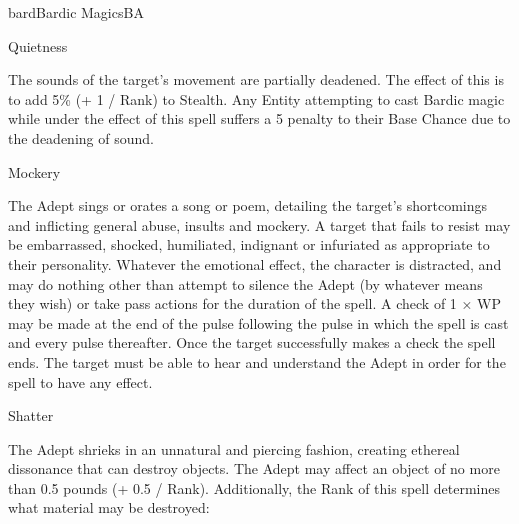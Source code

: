 \begin{College}[2.1]{bard}{Bardic Magics}{BA}
\begin{spell}[G-5]{Quietness}

\begin{effects}
The sounds of the target’s movement are partially deadened. The effect
of this is to add 5\% (+ 1 / Rank) to Stealth.  Any Entity attempting
to cast Bardic magic while under the effect of this spell suffers a 5
penalty to their Base Chance due to the deadening of sound.
\end{effects}
\end{spell}

\begin{spell}[G-6]{Mockery}

\begin{effects}
The Adept sings or orates a song or poem, detailing the target’s
shortcomings and inflicting general abuse, insults and mockery.  A
target that fails to resist may be embarrassed, shocked, humiliated,
indignant or infuriated as appropriate to their personality.  Whatever
the emotional effect, the character is distracted, and may do nothing
other than attempt to silence the Adept (by whatever means they wish)
or take pass actions for the duration of the spell.  A check of 1 × WP
may be made at the end of the pulse following the pulse in which the
spell is cast and every pulse thereafter.  Once the target
successfully makes a check the spell ends.  The target must be able to
hear and understand the Adept in order for the spell to have any
effect.
\end{effects}
\end{spell}

\begin{spell}[G-7]{Shatter}

\begin{effects}
The Adept shrieks in an unnatural and piercing fashion, creating
ethereal dissonance that can destroy objects.  The Adept may affect an
object of no more than 0.5 pounds (+ 0.5 / Rank).  Additionally, the
Rank of this spell determines what material may be destroyed:


\end{effects}
\end{spell}
\end{College}
